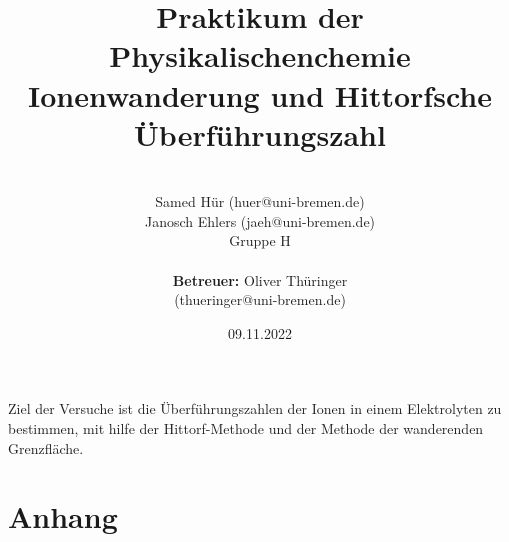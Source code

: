 \documentclass[a4paper, 11pt]{article}
\title{Praktikum der Physikalischenchemie\\\large Ionenwanderung und Hittorfsche Überführungszahl}
\author{\\Samed Hür (huer@uni-bremen.de)\\Janosch Ehlers (jaeh@uni-bremen.de)\\\small Gruppe H\\ \\ \textbf{Betreuer:} Oliver Thüringer\\(thueringer@uni-bremen.de)}
\date{09.11.2022}
\begin{document}
\thispagestyle{empty}
\maketitle
\newpage

\tableofcontents
\thispagestyle{empty}
\newpage


Ziel der Versuche ist die Überführungszahlen der Ionen in einem Elektrolyten zu bestimmen, mit hilfe der Hittorf-Methode und der Methode der wanderenden Grenzfläche.

\newpage

\newpage

\newpage


\newpage

\printbibliography

\section{Anhang}
\end{document}
